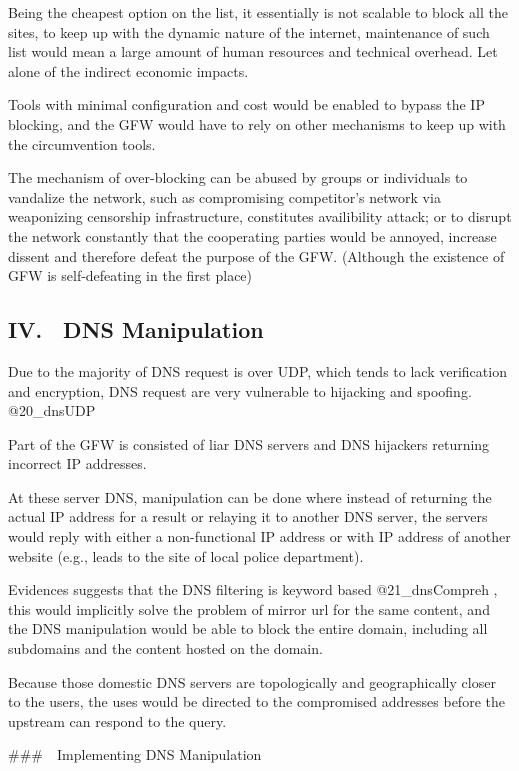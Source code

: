 Being the cheapest option on the list, it essentially is not scalable to
block all the sites, to keep up with the dynamic nature of the internet,
maintenance of such list would mean a large amount of human resources
and technical overhead. Let alone of the indirect economic impacts.

Tools with minimal configuration and cost would be enabled to bypass the
IP blocking, and the GFW would have to rely on other mechanisms to keep
up with the circumvention tools.

The mechanism of over-blocking can be abused by groups or individuals to
vandalize the network, such as compromising competitor's network via
weaponizing censorship infrastructure, constitutes availibility attack;
or to disrupt the network constantly that the cooperating parties would
be annoyed, increase dissent and therefore defeat the purpose of the
GFW. (Although the existence of GFW is self-defeating in the first
place)

\hypertarget{iv.-dns-manipulation}{%
\subsection{IV. DNS Manipulation}\label{iv.-dns-manipulation}}

Due to the majority of DNS request is over UDP, which tends to lack
verification and encryption, DNS request are very vulnerable to
hijacking and spoofing. @20\_dnsUDP

Part of the GFW is consisted of liar DNS servers and DNS hijackers
returning incorrect IP addresses.

At these server DNS, manipulation can be done where instead of returning
the actual IP address for a result or relaying it to another DNS server,
the servers would reply with either a non-functional IP address or with
IP address of another website (e.g., leads to the site of local police
department).

Evidences suggests that the DNS filtering is keyword based
@21\_dnsCompreh , this would implicitly solve the problem of mirror url
for the same content, and the DNS manipulation would be able to block
the entire domain, including all subdomains and the content hosted on
the domain.

Because those domestic DNS servers are topologically and geographically
closer to the users, the uses would be directed to the compromised
addresses before the upstream can respond to the query.

\#\#\# Implementing DNS Manipulation

